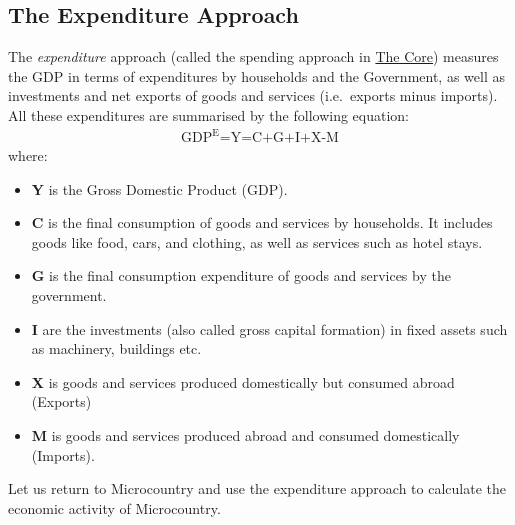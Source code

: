 \documentclass[
]{book}
\providecommand{\tightlist}{%
  \setlength{\itemsep}{0pt}\setlength{\parskip}{0pt}}
\begin{document}
\hypertarget{the-expenditure-approach}{%
\subsection*{The Expenditure Approach}\label{the-expenditure-approach}}

The \emph{expenditure} approach (called the spending approach in \href{https://core-econ.org/the-economy/index.html}{The Core}) measures the GDP in terms of expenditures by households and the Government, as well as investments and net exports of goods and services (i.e.~exports minus imports). All these expenditures are summarised by the following equation:
\begin{align}
   \text{GDP}^{\text{E}} \text{=Y=C+G+I+X-M}
\end{align}
where:

\begin{itemize}
\tightlist
\item
  \textbf{Y} is the Gross Domestic Product (GDP).
\item
  \textbf{C} is the final consumption of goods and services by households. It includes goods like food, cars, and clothing, as well as services such as hotel stays.
\item
  \textbf{G} is the final consumption expenditure of goods and services by the government.
\item
  \textbf{I} are the investments (also called gross capital formation) in fixed assets such as machinery, buildings etc.
\item
  \textbf{X} is goods and services produced domestically but consumed abroad (Exports)
\item
  \textbf{M} is goods and services produced abroad and consumed domestically (Imports).
\end{itemize}

Let us return to Microcountry and use the expenditure approach to calculate the economic activity of Microcountry.
\end{document}
